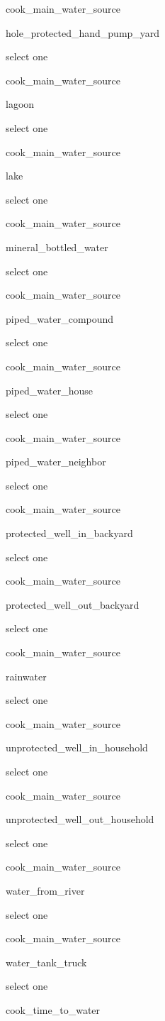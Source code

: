 \documentclass[]{article}
\begin{document}
cook\_main\_water\_source

hole\_protected\_hand\_pump\_yard

select one

cook\_main\_water\_source

lagoon

select one

cook\_main\_water\_source

lake

select one

cook\_main\_water\_source

mineral\_bottled\_water

select one

cook\_main\_water\_source

piped\_water\_compound

select one

cook\_main\_water\_source

piped\_water\_house

select one

cook\_main\_water\_source

piped\_water\_neighbor

select one

cook\_main\_water\_source

protected\_well\_in\_backyard

select one

cook\_main\_water\_source

protected\_well\_out\_backyard

select one

cook\_main\_water\_source

rainwater

select one

cook\_main\_water\_source

unprotected\_well\_in\_household

select one

cook\_main\_water\_source

unprotected\_well\_out\_household

select one

cook\_main\_water\_source

water\_from\_river

select one

cook\_main\_water\_source

water\_tank\_truck

select one

cook\_time\_to\_water
\end{document}

